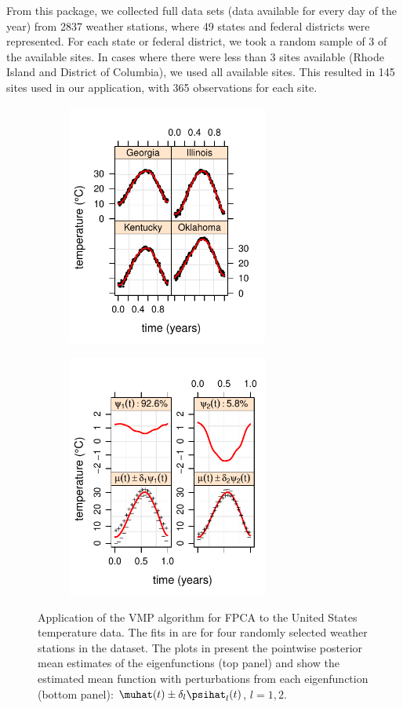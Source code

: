 \documentclass[ba]{imsart}
\numberwithin{equation}{section}
\theoremstyle{plain}
\begin{document}
From this package, we collected full data sets (data available for every day
of the year) from 2837 weather stations, where 49 states and federal districts were represented. For each
state or federal district, we took a random sample of 3 of the available sites. In cases where there were
less than 3 sites available (Rhode Island and District of Columbia), we used all available sites. This resulted
in 145 sites used in our application, with 365 observations for each site.

\begin{figure}
	\centering
	\begin{subfigure}[t]{0.49\textwidth}
		\centering
		\includegraphics[width=2.6in]{images/us_fits.pdf}
	\caption{}
	\label{subfig:us_fits}
	\end{subfigure}
	\begin{subfigure}[t]{0.49\textwidth}
		\centering
		\includegraphics[width=2.6in]{images/us_bf.pdf}
	\caption{}
	\label{subfig:us_mean_shift}
	\end{subfigure}
\caption{
	Application of the VMP algorithm for FPCA to the United States temperature data. The fits in 
	are for four randomly selected weather stations in the dataset.
	The plots in  present the pointwise posterior mean estimates of the eigenfunctions
	(top panel) and
	show the estimated mean function with
	perturbations from each eigenfunction (bottom panel): $\muhat (t) \pm \delta_l \psihat_l (t)$,
	$l = 1, 2$.
}
\label{fig:us_weather_data}
\end{figure}
\end{document}
